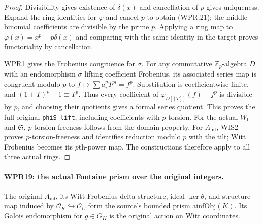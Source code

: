\begin{proof}
Divisibility gives existence of $\delta(x)$ and cancellation of
$p$ gives uniqueness. Expand the ring identities for $\varphi$
and cancel $p$ to obtain (WPR.21); the middle binomial
coefficients are divisible by the prime $p$. Applying a ring
map to $\varphi(x)=x^p+p\delta(x)$ and comparing with the
same identity in the target proves functoriality by cancellation.

WPR1 gives the Frobenius congruence for $\sigma$. For any
commutative $\mathbb Z_p$-algebra $D$ with an endomorphism
$\sigma$ lifting coefficient Frobenius, its associated series
map is congruent modulo $p$ to
$f\mapsto\sum a_i^pT^{pi}=f^p$. Substitution is coefficientwise
finite, and $(1+T)^p-1\equiv T^p$. Thus every coefficient of
$\varphi_{D[[T]]}(f)-f^p$ is divisible by $p$, and choosing
their quotients gives a formal series quotient. This proves the
full original \texttt{phiS\_lift}, including coefficients with
$p$-torsion. For the actual $W_0$ and $\mathfrak S$,
$p$-torsion-freeness follows from the domain property.
For $A_{\mathrm{inf}}$, WIS2 proves $p$-torsion-freeness and identifies
reduction modulo $p$ with the tilt; Witt Frobenius becomes its
$p$th-power map. The constructions therefore apply to all three
actual rings.
\end{proof}

\paragraph{WPR19: the actual Fontaine prism over the original integers.}
\label{claim:WPR19}
The original $A_{\mathrm{inf}}$, its Witt-Frobenius delta structure,
ideal $\ker\theta$, and structure map induced by
$\mathcal O_K\hookrightarrow\mathcal O_C$ form the source's
bounded prism $\mathrm{ainfObj}(K)$. Its Galois endomorphism
for $g\in G_K$ is the original action on Witt coordinates.

